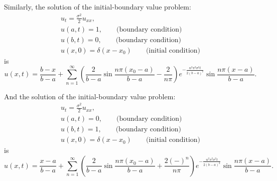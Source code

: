 Similarly, the solution of the initial-boundary value problem:
\begin{gather*}
	u_t = \frac{\sigma^2}{2} u_{xx},   \\
	u(a,t)=1,              \qquad \text{(boundary condition)}     \\
	u(b,t)=0,              \qquad \text{(boundary condition)}     \\
	u(x,0) = \delta(x-x_0) \qquad \text{(initial condition)}
\end{gather*}
is
\begin{equation}
	u(x,t) = \frac{b-x}{b-a}
	+ \sum_{n=1}^{\infty} 
	  \left( \frac{2}{b-a} \sin \frac{n\pi (x_0-a)}{b-a} -\frac{2}{n\pi} \right)
		e^{-\frac{n^2\pi^2 \sigma^2 t}{2(b-a)^2}} \sin \frac{n\pi (x-a)}{b-a}.
\end{equation}

And the solution of the initial-boundary value problem:
\begin{gather*}
	u_t = \frac{\sigma^2}{2} u_{xx},   \\
	u(a,t)=0,              \qquad \text{(boundary condition)}     \\
	u(b,t)=1,              \qquad \text{(boundary condition)}     \\
	u(x,0) = \delta(x-x_0) \qquad \text{(initial condition)}
\end{gather*}
is
\begin{equation}
	u(x,t) = \frac{x-a}{b-a}
	+ \sum_{n=1}^{\infty} 
	\left( \frac{2}{b-a} \sin \frac{n\pi (x_0-a)}{b-a} +\frac{2(-)^n}{n\pi} \right)
		e^{-\frac{n^2\pi^2 \sigma^2 t}{2(b-a)^2}} \sin \frac{n\pi (x-a)}{b-a}.
\end{equation}
